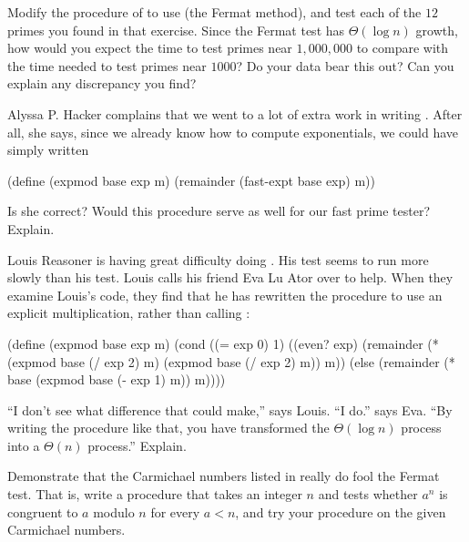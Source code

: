 \begin{exercise}
	\label{Exercise 1.24}
	Modify the   procedure of  to use  (the Fermat method), and test each of the \( 12 \) primes you found in that exercise.
	Since the Fermat test has \( Θ(\log n) \) growth, how would you expect the time to test primes near \( 1,000,000 \) to compare with the time needed to test primes near \( 1000 \)?
	Do your data bear this out?
	Can you explain any discrepancy you find?
\end{exercise}



\begin{exercise}
	\label{Exercise 1.25}
	Alyssa P. Hacker complains that we went to a lot of extra work in writing .
	After all, she says, since we already know how to compute exponentials, we could have simply written
	\begin{scheme}
	  (define (expmod base exp m)
	    (remainder (fast-expt base exp) m))
	\end{scheme}
	Is she correct?
	Would this procedure serve as well for our fast prime tester?
	Explain.
\end{exercise}



\begin{exercise}
	\label{Exercise 1.26}
	Louis Reasoner is having great difficulty doing .
	His  test seems to run more slowly than his  test.
	Louis calls his friend Eva Lu Ator over to help.
	When they examine Louis’s code, they find that he has rewritten the  procedure to use an explicit multiplication, rather than calling :
	\begin{scheme}
	  (define (expmod base exp m)
	    (cond ((= exp 0) 1)
	          ((even? exp)
	           (remainder (* (expmod base (/ exp 2) m)
	                         (expmod base (/ exp 2) m))
	                      m))
	          (else
	           (remainder (* base
	                         (expmod base (- exp 1) m))
	                      m))))
	\end{scheme}
	“I don’t see what difference that could make,” says Louis.
	“I do.” says Eva.
	“By writing the procedure like that, you have transformed the \( Θ(\log n) \) process into a \( Θ(n) \) process.”
	Explain.
\end{exercise}



\begin{exercise}
	\label{Exercise 1.27}
	Demonstrate that the Carmichael  numbers listed in  really do fool the Fermat test.
	That is, write a procedure that takes an integer \( n \) and tests whether \( a^n \) is congruent to \( a \) modulo \( n \) for every \( a < n \), and try your procedure on the given Carmichael numbers.
\end{exercise}




